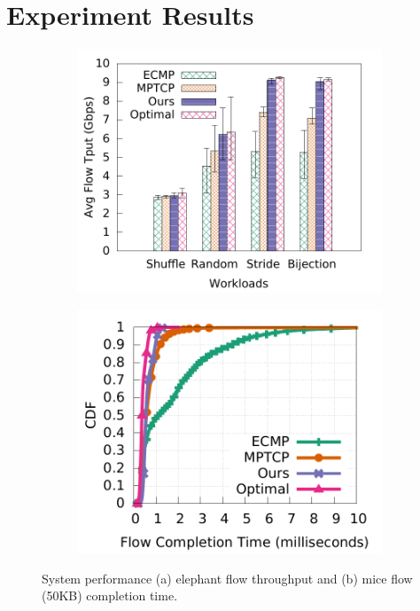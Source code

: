 \section{Experiment Results}
\begin{figure}[t]
        \centering
        \begin{subfigure}[b]{0.225\textwidth}
                \centering
                \includegraphics[width=\textwidth]{./figures/macro/stride/macro_compare_tput_witherrbar.pdf}
                \caption{}
                \label{tput}
        \end{subfigure}
        \begin{subfigure}[b]{0.225\textwidth}
                \centering
                \includegraphics[width=\textwidth]{./figures/macro/bijection/macro_compare_fct_bijection_mice.pdf}
                \caption{}
                \label{fct}
        \end{subfigure}
        \caption{System performance (a) elephant flow throughput and (b) mice flow (50KB) completion time.}
        \label{performance}
\end{figure}


